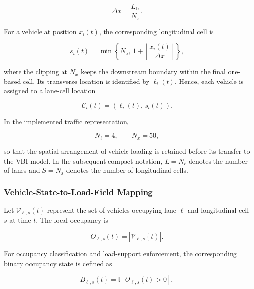 \documentclass[journal]{IEEEtran}
\begin{document}
\begin{equation}
\Delta x
=
\frac{L_{\mathrm{tr}}}{N_x}.
\label{eq:cell_size}
\end{equation}

For a vehicle at position $x_i(t)$, the corresponding longitudinal cell is

\begin{equation}
s_i(t)
=
\min\left\{
N_x,\,
1+\left\lfloor
\frac{x_i(t)}{\Delta x}
\right\rfloor
\right\},
\label{eq:cell_index}
\end{equation}

where the clipping at $N_x$ keeps the downstream boundary within the final one-based cell. Its transverse location is identified by $\ell_i(t)$. Hence, each vehicle is assigned to a lane-cell location

\begin{equation}
\mathcal{C}_i(t)
=
\left(
\ell_i(t),\,s_i(t)
\right).
\label{eq:lane_cell_location}
\end{equation}

In the implemented traffic representation,

\begin{equation}
N_{\ell}=4,
\qquad
N_x=50,
\label{eq:grid_configuration}
\end{equation}

so that the spatial arrangement of vehicle loading is retained before its transfer to the VBI model. In the subsequent compact notation, $L=N_{\ell}$ denotes the number of lanes and $S=N_x$ denotes the number of longitudinal cells.





\subsubsection{Vehicle-State-to-Load-Field Mapping}
\label{subsec:load_field_mapping}

Let $\mathcal{V}_{\ell,s}(t)$ represent the set of vehicles occupying lane $\ell$ and longitudinal cell $s$ at time $t$. The local occupancy is

\begin{equation}
O_{\ell,s}(t)
=
\left|
\mathcal{V}_{\ell,s}(t)
\right|.
\label{eq:cell_occupancy}
\end{equation}

For occupancy classification and load-support enforcement, the corresponding binary occupancy state is defined as

\begin{equation}
B_{\ell,s}(t)
=
\mathbb{I}\left[O_{\ell,s}(t)>0\right],
\label{eq:binary_occupancy}
\end{equation}
\end{document}
